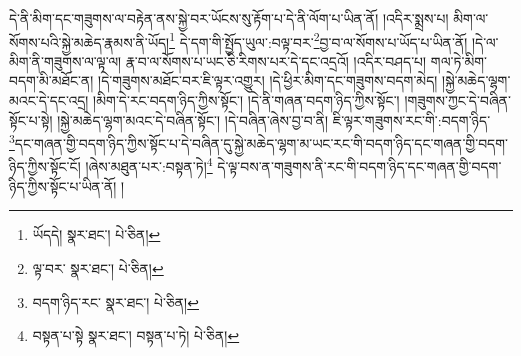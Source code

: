 དེ་ནི་མིག་དང་གཟུགས་ལ་བརྟེན་ནས་སྐྱེ་བར་ཡོངས་སུ་རྟོག་པ་དེ་ནི་ལོག་པ་ཡིན་ནོ། །འདིར་སྨྲས་པ། མིག་ལ་སོགས་པའི་སྐྱེ་མཆེད་རྣམས་ནི་ཡོད།\footnote{ཡོདདེ།  སྣར་ཐང་།  པེ་ཅིན། } དེ་དག་གི་སྤྱོད་ཡུལ་:བལྟ་བར་\footnote{ལྟ་བར་  སྣར་ཐང་།  པེ་ཅིན། }བྱ་བ་ལ་སོགས་པ་ཡོད་པ་ཡིན་ནོ། །དེ་ལ་མིག་ནི་གཟུགས་ལ་ལྟ་ལ། རྣ་བ་ལ་སོགས་པ་ཡང་ཅི་རིགས་པར་དེ་དང་འདྲའོ། །འདིར་བཤད་པ། གལ་ཏེ་མིག་བདག་མི་མཐོང་ན། །དེ་གཟུགས་མཐོང་བར་ཇི་ལྟར་འགྱུར། །དེ་ཕྱིར་མིག་དང་གཟུགས་བདག་མེད། །སྐྱེ་མཆེད་ལྷག་མའང་དེ་དང་འདྲ། །མིག་དེ་རང་བདག་ཉིད་ཀྱིས་སྟོང་། །དེ་ནི་གཞན་བདག་ཉིད་ཀྱིས་སྟོང་། །གཟུགས་ཀྱང་དེ་བཞིན་སྟོང་པ་སྟེ། །སྐྱེ་མཆེད་ལྷག་མའང་དེ་བཞིན་སྟོང་། །དེ་བཞིན་ཞེས་བྱ་བ་ནི། ཇི་ལྟར་གཟུགས་རང་གི་:བདག་ཉིད་\footnote{བདག་ཉིད་རང་  སྣར་ཐང་།  པེ་ཅིན། }དང་གཞན་གྱི་བདག་ཉིད་ཀྱིས་སྟོང་པ་དེ་བཞིན་དུ་སྐྱེ་མཆེད་ལྷག་མ་ཡང་རང་གི་བདག་ཉིད་དང་གཞན་གྱི་བདག་ཉིད་ཀྱིས་སྟོང་ངོ། །ཞེས་མཐུན་པར་:བསྟན་ཏེ།\footnote{བསྟན་པ་སྟེ  སྣར་ཐང་། བསྟན་པ་ཏེ།  པེ་ཅིན། } དེ་ལྟ་བས་ན་གཟུགས་ནི་རང་གི་བདག་ཉིད་དང་གཞན་གྱི་བདག་ཉིད་ཀྱིས་སྟོང་པ་ཡིན་ནོ། །
